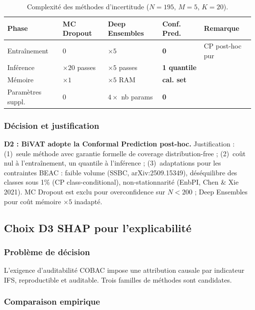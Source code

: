 \documentclass[12pt,a4paper]{article}
\begin{document}
\begin{table}[ht]
\centering
\caption{Complexité des méthodes d'incertitude ($N=195$, $M=5$, $K=20$).}
\label{tab:complexite-d2}
\small
\begin{tabular}{p{3.5cm}p{2.5cm}p{2.5cm}p{2.5cm}p{3.5cm}}
\toprule
\textbf{Phase} & \textbf{MC Dropout} &
\textbf{Deep Ensembles} & \textbf{Conf. Pred.} &
\textbf{Remarque} \\
\midrule
Entraînement & 0 & $\times 5$ & \textbf{0} & CP post-hoc pur \\
Inférence & $\times 20$ passes & $\times 5$ passes & \textbf{1 quantile} & \\
Mémoire & $\times 1$ & $\times 5$ RAM & \textbf{cal. set} & \\
Paramètres suppl. & 0 & $4\times$ nb params & \textbf{0} & \\
\bottomrule
\end{tabular}
\end{table}

\subsubsection{Décision et justification}

\textbf{D2 : BiVAT adopte la Conformal Prediction post-hoc.} Justification :
(1)~seule méthode avec garantie formelle de coverage distribution-free ; (2)~coût
nul à l'entraînement, un quantile à l'inférence ; (3)~adaptations pour les
contraintes BEAC : faible volume (SSBC, arXiv:2509.15349), déséquilibre des
classes sous 1\% (CP class-conditional), non-stationnarité (EnbPI, Chen \&
Xie 2021). MC Dropout est exclu pour overconfidence sur $N < 200$ ; Deep
Ensembles pour coût mémoire $\times 5$ inadapté.

\subsection{Choix D3  SHAP pour l'explicabilité}

\subsubsection{Problème de décision}

L'exigence d'auditabilité COBAC impose une attribution causale par indicateur IFS,
reproductible et auditable. Trois familles de méthodes sont candidates.

\subsubsection{Comparaison empirique}
\end{document}
